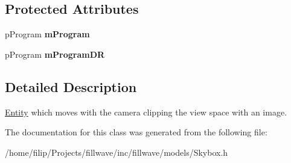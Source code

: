 \subsection*{Protected Attributes}
\begin{DoxyCompactItemize}
\item 
\hypertarget{classfillwave_1_1models_1_1Skybox_a99f1aa3d549c9887629be8f2290b0929}{}p\+Program {\bfseries m\+Program}\label{classfillwave_1_1models_1_1Skybox_a99f1aa3d549c9887629be8f2290b0929}

\item 
\hypertarget{classfillwave_1_1models_1_1Skybox_a6aa65fb453ee614e007d9083413fe96b}{}p\+Program {\bfseries m\+Program\+D\+R}\label{classfillwave_1_1models_1_1Skybox_a6aa65fb453ee614e007d9083413fe96b}

\end{DoxyCompactItemize}


\subsection{Detailed Description}
\hyperlink{classfillwave_1_1models_1_1Entity}{Entity} which moves with the camera clipping the view space with an image. 

The documentation for this class was generated from the following file\+:\begin{DoxyCompactItemize}
\item 
/home/filip/\+Projects/fillwave/inc/fillwave/models/Skybox.\+h\end{DoxyCompactItemize}
